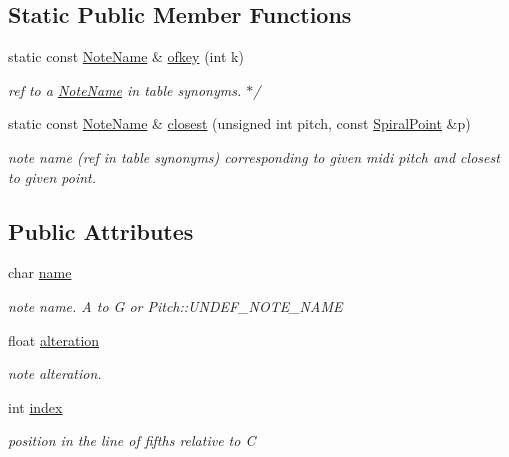 \subsection*{Static Public Member Functions}
\begin{DoxyCompactItemize}
\item 
static const \mbox{\hyperlink{structNoteName}{Note\+Name}} \& \mbox{\hyperlink{group__segment_ga055480a382a6fde05bde51abed31a56c}{ofkey}} (int k)
\begin{DoxyCompactList}\small\item\em ref to a \mbox{\hyperlink{structNoteName}{Note\+Name}} in table synonyms. $\ast$/ \end{DoxyCompactList}\item 
static const \mbox{\hyperlink{structNoteName}{Note\+Name}} \& \mbox{\hyperlink{group__segment_gaf4a2321d9bc5a69a5b8a94cf1e146052}{closest}} (unsigned int pitch, const \mbox{\hyperlink{structSpiralPoint}{Spiral\+Point}} \&p)
\begin{DoxyCompactList}\small\item\em note name (ref in table synonyms) corresponding to given midi pitch and closest to given point. \end{DoxyCompactList}\end{DoxyCompactItemize}
\subsection*{Public Attributes}
\begin{DoxyCompactItemize}
\item 
char \mbox{\hyperlink{structNoteName_acd97c2eed21a588fb362e3838183c2d9}{name}}
\begin{DoxyCompactList}\small\item\em note name. \textquotesingle{}A\textquotesingle{} to \textquotesingle{}G\textquotesingle{} or Pitch\+::\+U\+N\+D\+E\+F\+\_\+\+N\+O\+T\+E\+\_\+\+N\+A\+ME \end{DoxyCompactList}\item 
float \mbox{\hyperlink{structNoteName_a6b6ddfa2befdb91e8f2a283569efe579}{alteration}}
\begin{DoxyCompactList}\small\item\em note alteration. \end{DoxyCompactList}\item 
int \mbox{\hyperlink{structNoteName_adf37d714ab36d4769052e4145873fe29}{index}}
\begin{DoxyCompactList}\small\item\em position in the line of fifths relative to C \end{DoxyCompactList}\end{DoxyCompactItemize}
